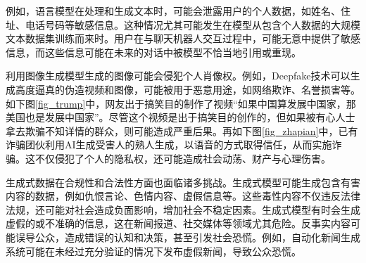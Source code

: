 \documentclass[a4paper]{nuist}
\begin{document}
例如，语言模型在处理和生成文本时，可能会泄露用户的个人数据，如姓名、住址、电话号码等敏感信息。这种情况尤其可能发生在模型从包含个人数据的大规模文本数据集训练而来时。用户在与聊天机器人交互过程中，可能无意中提供了敏感信息，而这些信息可能在未来的对话中被模型不恰当地引用或重现。

利用图像生成模型生成的图像可能会侵犯个人肖像权。例如，Deepfake技术可以生成高度逼真的伪造视频和图像，可能被用于恶意用途，如网络欺诈、名誉损害等。如下图\ref{fig_trump}中，网友出于搞笑目的制作了视频“如果中国算发展中国家，那美国也是发展中国家”。尽管这个视频是出于搞笑目的创作的，但如果被有心人士拿去欺骗不知详情的群众，则可能造成严重后果。再如下图\ref{fig_zhapian}中，已有诈骗团伙利用AI生成受害人的熟人生成，以语音的方式取得信任，从而实施诈骗。这不仅侵犯了个人的隐私权，还可能造成社会动荡、财产与心理伤害。

\begin{figure}[htbp]
    \center

\end{figure}

生成式数据在合规性和合法性方面也面临诸多挑战。生成式模型可能生成包含有害内容的数据，例如仇恨言论、色情内容、虚假信息等。这些毒性内容不仅违反法律法规，还可能对社会造成负面影响，增加社会不稳定因素。生成式模型有时会生成虚假的或不准确的信息，这在新闻报道、社交媒体等领域尤其危险。反事实内容可能误导公众，造成错误的认知和决策，甚至引发社会恐慌。例如，自动化新闻生成系统可能在未经过充分验证的情况下发布虚假新闻，导致公众恐慌。
\end{document}

